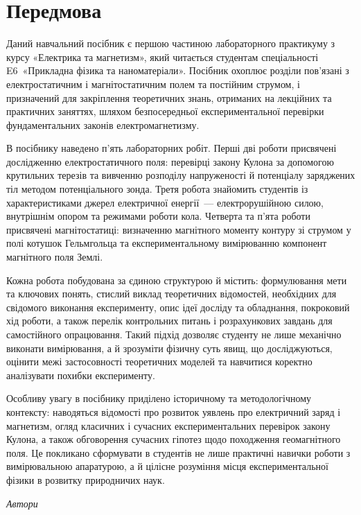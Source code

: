 
\chapter*{Передмова}\label{\currfilebase}


Даний навчальний посібник є першою частиною лабораторного практикуму
з курсу «Електрика та магнетизм», який читається студентам спеціальності
E6~«Прикладна фізика та наноматеріали». Посібник охоплює
розділи пов'язані з електростатичним і
магнітостатичним полем та постійним струмом, і призначений для
закріплення теоретичних знань, отриманих на лекційних та практичних
заняттях, шляхом безпосередньої експериментальної перевірки
фундаментальних законів електромагнетизму.

В посібнику наведено п'ять лабораторних робіт. Перші дві роботи
присвячені дослідженню електростатичного поля: перевірці закону Кулона
за допомогою крутильних терезів та вивченню розподілу напруженості й
потенціалу заряджених тіл методом потенціального зонда. Третя робота
знайомить студентів із характеристиками джерел електричної енергії~---
електрорушійною силою, внутрішнім опором та режимами роботи кола.
Четверта та п'ята роботи присвячені магнітостатиці: визначенню
магнітного моменту контуру зі струмом у полі котушок Гельмгольца та
експериментальному вимірюванню компонент магнітного поля Землі.

Кожна робота побудована за єдиною структурою й містить: формулювання
мети та ключових понять, стислий виклад теоретичних відомостей,
необхідних для свідомого виконання експерименту, опис ідеї досліду та
обладнання, покроковий хід роботи, а також перелік контрольних питань
і розрахункових завдань для самостійного опрацювання. Такий підхід
дозволяє студенту не лише механічно виконати вимірювання, а й
зрозуміти фізичну суть явищ, що досліджуються, оцінити межі
застосовності теоретичних моделей та навчитися коректно аналізувати
похибки експерименту.

Особливу увагу в посібнику приділено історичному та методологічному
контексту: наводяться відомості про розвиток уявлень про електричний
заряд і магнетизм, огляд класичних і сучасних експериментальних
перевірок закону Кулона, а також обговорення сучасних гіпотез щодо
походження геомагнітного поля. Це покликано сформувати в студентів не
лише практичні навички роботи з вимірювальною апаратурою, а й цілісне
розуміння місця експериментальної фізики в розвитку природничих наук.

\bigskip
\noindent
\hfill\textit{Автори}
